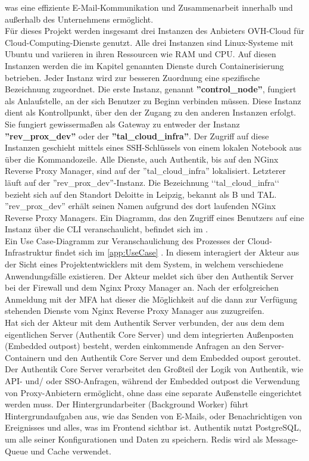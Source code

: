 was eine effiziente E-Mail-Kommunikation und Zusammenarbeit innerhalb und außerhalb des Unternehmens ermöglicht.
\\Für dieses Projekt werden insgesamt drei Instanzen des Anbieters OVH-Cloud für Cloud-Computing-Dienste genutzt. 
Alle drei Instanzen sind Linux-Systeme mit Ubuntu und variieren in ihren Ressourcen wie \acs{RAM} und \acs{CPU}. Auf 
diesen Instanzen werden die im Kapitel genannten Dienste durch Containerisierung betrieben. Jeder Instanz 
wird zur besseren Zuordnung eine spezifische Bezeichnung zugeordnet.
Die erste Instanz, genannt \textbf{''control\_node''}, fungiert als Anlaufstelle, an der sich Benutzer zu Beginn verbinden müssen.
Diese Instanz dient als Kontrollpunkt, über den der Zugang zu den anderen Instanzen erfolgt. Sie fungiert 
gewissermaßen als Gateway zu entweder der Instanz \textbf{''rev\_prox\_dev''} oder der \textbf{''tal\_cloud\_infra''}. 
Der Zugriff auf diese Instanzen geschieht mittels eines \acs{SSH}-Schlüssels von einem lokalen Notebook aus über die Kommandozeile.
Alle Dienste, auch Authentik, bis auf den NGinx Reverse Proxy Manager, sind auf der ''tal\_cloud\_infra'' lokalisiert. 
Letzterer läuft auf der ''rev\_prox\_dev''-Instanz. Die Bezeichnung ‘‘tal\_cloud\_infra‘‘ bezieht sich auf den Standort Deloitte in Leipzig, bekannt als \acs{B und TAL}. 
''rev\_prox\_dev'' erhält seinen Namen aufgrund des dort laufenden NGinx Reverse Proxy Managers. Ein Diagramm, das den Zugriff eines Benutzers auf eine Instanz  
über die \acs{CLI} veranschaulicht, befindet sich im  .
\\Ein Use Case-Diagramm zur Veranschaulichung des Prozesses der Cloud-Infrastruktur findet sich im  \ref{app:UseCase} .
In diesem interagiert der Akteur aus der Sicht eines Projektentwicklers mit dem System, in welchem verschiedene 
Anwendungsfälle existieren. Der Akteur meldet sich über den Authentik Server bei der Firewall und dem Nginx Proxy Manager an. 
Nach der erfolgreichen Anmeldung mit der \acs{MFA} hat dieser die Möglichkeit auf die dann zur Verfügung stehenden Dienste vom 
Nginx Reverse Proxy Manager aus zuzugreifen.
\\Hat sich der Akteur mit dem Authentik Server verbunden, der aus dem dem eigentlichen Server (Authentik Core Server) und dem 
integrierten Außenposten (Embedded outpost) besteht, werden einkommende Anfragen an den Server-Containern und den Authentik Core Server 
und dem Embedded oupost geroutet. Der Authentik Core Server verarbeitet den Großteil der Logik von Authentik, wie \zB \acs{API}- und/ oder 
\acs{SSO}-Anfragen, während der Embedded outpost die Verwendung von Proxy-Anbietern ermöglicht, ohne dass eine separate Außenstelle 
eingerichtet werden muss. Der Hintergrundarbeiter (Background Worker) führt Hintergrundaufgaben aus, wie das Senden von E-Mails, 
oder Benachrichtigen von Ereignisses und alles, was im Frontend sichtbar ist. Authentik nutzt PostgreSQL, um alle seiner 
Konfigurationen und Daten zu speichern. Redis wird als Message-Queue und Cache verwendet.


